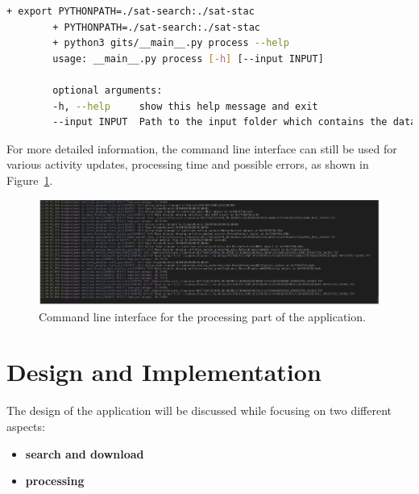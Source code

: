 \documentclass[12pt, a4paper]{report}
\begin{document}
	\begin{lstlisting}[caption={Detailed parameters required for the download script.},label={lst:processhelp},language=Bash]
		+ export PYTHONPATH=./sat-search:./sat-stac
		+ PYTHONPATH=./sat-search:./sat-stac
		+ python3 gits/__main__.py process --help
		usage: __main__.py process [-h] [--input INPUT]
		
		optional arguments:
		-h, --help     show this help message and exit
		--input INPUT  Path to the input folder which contains the dataset of glaciers.
	\end{lstlisting}

	For more detailed information, the command line interface can still be used for various activity updates, processing time and possible errors, as shown in Figure~\ref{fig:process_cmd}.

	\begin{figure}[h!]
	\centering
	\includegraphics[width=\columnwidth]{../images/process_cmd.png}
	\caption{Command line interface for the processing part of the application.}
	\label{fig:process_cmd}
	\end{figure}

	\newpage{}
	\chapter{Design and Implementation}
	\label{cha:design_and_implementation}
	
	\par The design of the application will be discussed while focusing on two different aspects:
	
	\begin{itemize}
		\item \textbf{search and download}
		\item \textbf{processing}
	\end{itemize}
\end{document}
